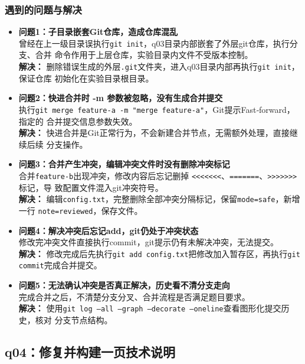 \documentclass{article}
\begin{document}
	\subsubsection{遇到的问题与解决}
	\begin{itemize}
		\item \textbf{问题1：子目录嵌套Git仓库，造成仓库混乱}
		\\ 曾经在上一级目录误执行\texttt{git init}，q03目录内部嵌套了外层git仓库，执行分支、合并
		命令作用于上层仓库，实验目录内文件不受版本控制。
		\\ \textbf{解决：} 删除错误生成的外层\texttt{.git}文件夹，进入q03目录内部再执行\texttt{git init}，保证仓库
		初始化在实验目录根目录。
		\item \textbf{问题2：快进合并时 -m 参数被忽略，没有生成合并提交}
		\\ 执行\texttt{git merge feature-a -m "merge feature-a"}，Git提示Fast‑forward，指定的
		合并提交信息参数失效。
		\\ \textbf{解决：} 快进合并是Git正常行为，不会新建合并节点，无需额外处理，直接继续后续
		分支操作。
		\item \textbf{问题3：合并产生冲突，编辑冲突文件时没有删除冲突标记}
		\\ 合并\texttt{feature‑b}出现冲突，修改内容后忘记删掉 \texttt{<<<<<<<}、\texttt{=======}、\texttt{>>>>>>>}标记，导
		致配置文件混入git冲突符号。
		\\ \textbf{解决：} 编辑\texttt{config.txt}，完整删除全部冲突分隔标记，保留\texttt{mode=safe}，新增一行
		\texttt{note=reviewed}，保存文件。
		\item \textbf{问题4：解决冲突后忘记add，git仍处于冲突状态}
		\\ 修改完冲突文件直接执行commit，git提示仍有未解决冲突，无法提交。
		\\ \textbf{解决：} 修改完成后先执行\texttt{git add config.txt}把修改加入暂存区，再执行\texttt{git commit}完成合并提交。
		\item \textbf{问题5：无法确认冲突是否真正解决，历史看不清分支走向}
		\\ 完成合并之后，不清楚分支分叉、合并流程是否满足题目要求。
		\\ \textbf{解决：} 使用\texttt{git log --all --graph --decorate --oneline}查看图形化提交历史，核对
		分支节点结构。
	\end{itemize}
	
	\subsection{q04：修复并构建一页技术说明}
\end{document}
